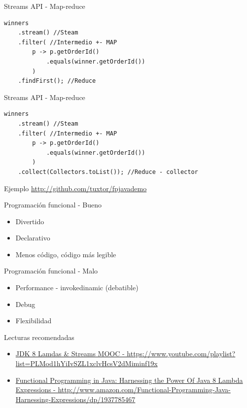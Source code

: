 \documentclass{beamer}
\begin{document}
\begin{frame}[fragile]{Streams API - Map-reduce}
\begin{lstlisting}
winners
	.stream() //Steam
	.filter( //Intermedio +- MAP
		p -> p.getOrderId()
			.equals(winner.getOrderId())
		)
	.findFirst(); //Reduce
\end{lstlisting}
\end{frame}

\begin{frame}[fragile]{Streams API - Map-reduce}
\begin{lstlisting}
winners
	.stream() //Steam
	.filter( //Intermedio +- MAP
		p -> p.getOrderId()
			.equals(winner.getOrderId())
		)
	.collect(Collectors.toList()); //Reduce - collector
\end{lstlisting}
\end{frame}

\begin{frame}{Ejemplo}
	\href{http://github.com/tuxtor/fpjavademo}{http://github.com/tuxtor/fpjavademo}
\end{frame}

\begin{frame}{Programación funcional - Bueno}
	\begin{itemize}
	\item Divertido
	\item Declarativo
	\item Menos código, código más legible
	\end{itemize}
\end{frame}

\begin{frame}{Programación funcional - Malo}
	\begin{itemize}
	\item Performance - invokedinamic (debatible)
	\item Debug
	\item Flexibilidad
	\end{itemize}
\end{frame}

\begin{frame}{Lecturas recomendadas}
	\begin{itemize}
	\item  \href{https://www.youtube.com/playlist?list=PLMod1hYiIvSZL1xclvHcsV2dMiminf19x}{JDK 8 Lamdas \& Streams MOOC - https://www.youtube.com/playlist?list=PLMod1hYiIvSZL1xclvHcsV2dMiminf19x}
	\item  \href{http://www.amazon.com/Functional-Programming-Java-Harnessing-Expressions/dp/1937785467}{Functional Programming in Java: Harnessing the Power Of Java 8 Lambda Expressions - http://www.amazon.com/Functional-Programming-Java-Harnessing-Expressions/dp/1937785467}
	\end{itemize}
\end{frame}
\end{document}

